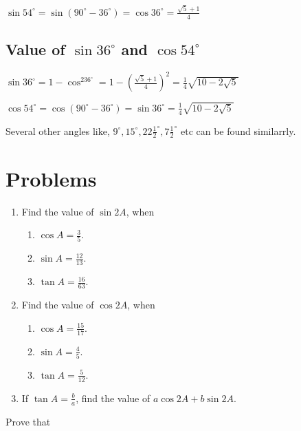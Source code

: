 \noindent $\sin 54^\circ = \sin(90^\circ - 36^\circ) = \cos36^\circ = \frac{\sqrt{5} + 1}{4}$

\subsection{Value of $\sin 36^\circ$ and $\cos 54^\circ$}
$\sin36^\circ = 1 - \cos^236^\circ = 1 - \left(\frac{\sqrt{5} + 1}{4}\right)^2 = \frac{1}{4}\sqrt{10 - 2\sqrt{5}}$

\noindent$\cos54^\circ = \cos(90^\circ - 36^\circ) = \sin36^\circ = \frac{1}{4}\sqrt{10 - 2\sqrt{5}}$

\noindent Several other angles like, $9^\circ, 15^\circ, 22\frac{1}{2}^\circ, 7\frac{1}{2}^\circ$ etc can be found similarrly.

\section{Problems}
\begin{enumerate}
\item Find the value of $\sin 2A$, when
  \begin{enumerate}
  \item $\cos A = \frac{3}{5}$.
  \item $\sin A = \frac{12}{13}$.
  \item $\tan A = \frac{16}{63}$.
  \end{enumerate}
\item Find the value of $\cos 2A$, when
  \begin{enumerate}
  \item $\cos A = \frac{15}{17}$.
  \item $\sin A = \frac{4}{5}$.
  \item $\tan A = \frac{5}{12}$.
  \end{enumerate}
\item If $\tan A = \frac{b}{a}$, find the value of $a\cos 2A+ b\sin 2A$.
\end{enumerate}

Prove that


